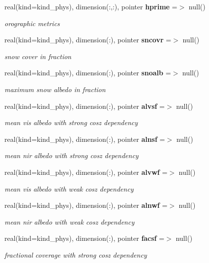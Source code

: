 \begin{DoxyCompactItemize}
real(kind=kind\+\_\+phys), dimension(\+:,\+:), pointer \textbf{ hprime} =$>$ null()
\begin{DoxyCompactList}\small\item\em orographic metrics \end{DoxyCompactList}\item 
real(kind=kind\+\_\+phys), dimension(\+:), pointer \textbf{ sncovr} =$>$ null()
\begin{DoxyCompactList}\small\item\em snow cover in fraction \end{DoxyCompactList}\item 
real(kind=kind\+\_\+phys), dimension(\+:), pointer \textbf{ snoalb} =$>$ null()
\begin{DoxyCompactList}\small\item\em maximum snow albedo in fraction \end{DoxyCompactList}\item 
real(kind=kind\+\_\+phys), dimension(\+:), pointer \textbf{ alvsf} =$>$ null()
\begin{DoxyCompactList}\small\item\em mean vis albedo with strong cosz dependency \end{DoxyCompactList}\item 
real(kind=kind\+\_\+phys), dimension(\+:), pointer \textbf{ alnsf} =$>$ null()
\begin{DoxyCompactList}\small\item\em mean nir albedo with strong cosz dependency \end{DoxyCompactList}\item 
real(kind=kind\+\_\+phys), dimension(\+:), pointer \textbf{ alvwf} =$>$ null()
\begin{DoxyCompactList}\small\item\em mean vis albedo with weak cosz dependency \end{DoxyCompactList}\item 
real(kind=kind\+\_\+phys), dimension(\+:), pointer \textbf{ alnwf} =$>$ null()
\begin{DoxyCompactList}\small\item\em mean nir albedo with weak cosz dependency \end{DoxyCompactList}\item 
real(kind=kind\+\_\+phys), dimension(\+:), pointer \textbf{ facsf} =$>$ null()
\begin{DoxyCompactList}\small\item\em fractional coverage with strong cosz dependency \end{DoxyCompactList}\item 

\end{DoxyCompactItemize}
